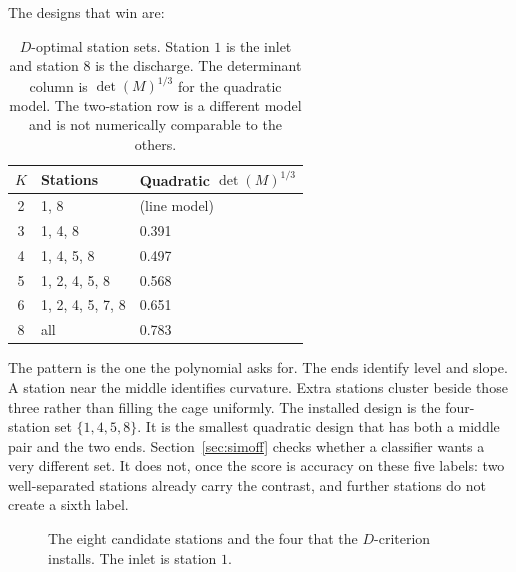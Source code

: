 The designs that win are:

\begin{table}[ht]
\centering
\caption{\(D\)-optimal station sets. Station \(1\) is the inlet and station \(8\) is the discharge. The determinant column is \(\det(M)^{1/3}\) for the quadratic model. The two-station row is a different model and is not numerically comparable to the others.}
\label{tab:dopt}
\begin{tabular}{@{}cll@{}}
\toprule
\(K\) & Stations & Quadratic \(\det(M)^{1/3}\) \\
\midrule
2 & 1, 8 & (line model) \\
3 & 1, 4, 8 & 0.391 \\
4 & 1, 4, 5, 8 & 0.497 \\
5 & 1, 2, 4, 5, 8 & 0.568 \\
6 & 1, 2, 4, 5, 7, 8 & 0.651 \\
8 & all & 0.783 \\
\bottomrule
\end{tabular}
\end{table}

The pattern is the one the polynomial asks for. The ends identify level and slope. A station near the middle identifies curvature. Extra stations cluster beside those three rather than filling the cage uniformly. The installed design is the four-station set \(\{1,4,5,8\}\). It is the smallest quadratic design that has both a middle pair and the two ends. Section~\ref{sec:simoff} checks whether a classifier wants a very different set. It does not, once the score is accuracy on these five labels: two well-separated stations already carry the contrast, and further stations do not create a sixth label.

\begin{figure}[ht]
\centering
{}
\caption{The eight candidate stations and the four that the \(D\)-criterion installs. The inlet is station \(1\).}
\label{fig:stations}
\end{figure}

